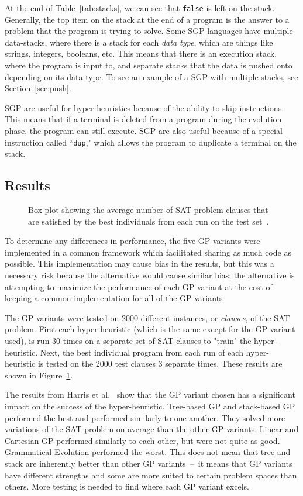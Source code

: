 \documentclass{sig-alternate}
\begin{document}
At the end of Table~\ref{tab:stacks}, we can see that \texttt{false} is left on the stack. Generally, the top item on the stack at the end of a program is the answer to a problem that the program is trying to solve. Some SGP languages have multiple data-stacks, where there is a stack for each \textit{data type}, which are things like strings, integers, booleans, etc. This means that there is an execution stack, where the program is input to, and separate stacks that the data is pushed onto depending on its data type. To see an example of a SGP with multiple stacks, see Section~\ref{sec:push}.

SGP are useful for hyper-heuristics because of the ability to skip instructions. This means that if a terminal is deleted from a program during the evolution phase, the program can still execute. SGP are also useful because of a special instruction called ``\texttt{dup}," which allows the program to duplicate a terminal on the stack.

\subsection{Results}
\label{sec:gpresults}
\begin{figure}
	\centering
	\caption{Box plot showing the average number of SAT problem clauses that are satisfied by the best individuals from each run on the test set~\cite{harris:2015}.}
	\label{fig:gpvariants}
\end{figure}

To determine any differences in performance, the five GP variants were implemented in a common framework which facilitated sharing as much code as possible. This implementation may cause bias in the results, but this was a necessary risk because the alternative would cause similar bias; the alternative is attempting to maximize the performance of each GP variant at the cost of keeping a common implementation for all of the GP variants~\cite{harris:2015}

The GP variants were tested on 2000 different instances, or \textit{clauses}, of the SAT problem. First each hyper-heuristic (which is the same except for the GP variant used), is run 30 times on a separate set of SAT clauses to "train" the hyper-heuristic. Next, the best individual program from each run of each hyper-heuristic is tested on the 2000 test clauses 3 separate times. These results are shown in Figure~\ref{fig:gpvariants}.

The results from Harris et al.~\cite{harris:2015} show that the GP variant chosen has a significant impact on the success of the hyper-heuristic. Tree-based GP and stack-based GP performed the best and performed similarly to one another. They solved more variations of the SAT problem on average than the other GP variants. Linear and Cartesian GP performed similarly to each other, but were not quite as good. Grammatical Evolution performed the worst. This does not mean that tree and stack are inherently better than other GP variants~--~it means that GP variants have different strengths and some are more suited to certain problem spaces than others. More testing is needed to find where each GP variant excels.
\end{document}
